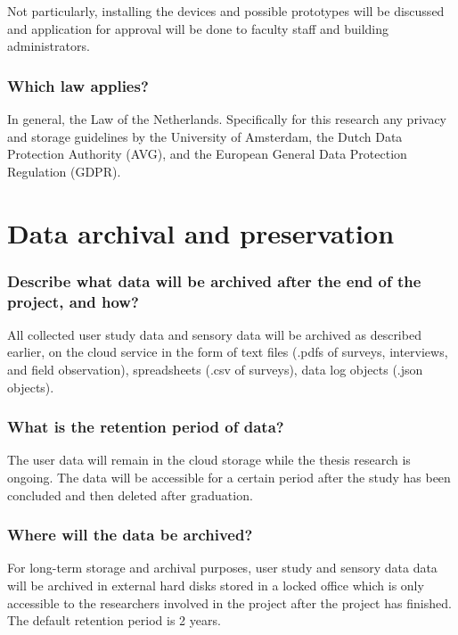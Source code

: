 \documentclass[a4paper]{article}
\begin{document}
Not particularly, installing the devices and possible prototypes will be discussed and application for approval will be done to faculty staff and building administrators.

\subsubsection{Which law applies?}

In general, the Law of the Netherlands. Specifically for this research any privacy and storage guidelines by the University of Amsterdam, the  Dutch Data Protection Authority (AVG), and the European General Data Protection Regulation (GDPR).

\section{Data archival and preservation}

\subsubsection{Describe what data will be archived after the end of the project, and how?}

All collected user study data and sensory data will be archived as described earlier, on the cloud service in the form of text files (.pdfs of surveys, interviews, and field observation), spreadsheets (.csv of surveys), data log objects (.json objects).

\subsubsection{What is the retention period of data?}

The user data will remain in the cloud storage while the thesis research is ongoing. The data will be accessible for a certain period after the study has been concluded and then deleted after graduation.

\subsubsection{Where will the data be archived?}

For long-term storage and archival purposes, user study and sensory data data will be archived in external hard disks stored in a locked office which is only accessible to the researchers involved in the project after the project has finished. The default retention period is 2 years.
\end{document}
